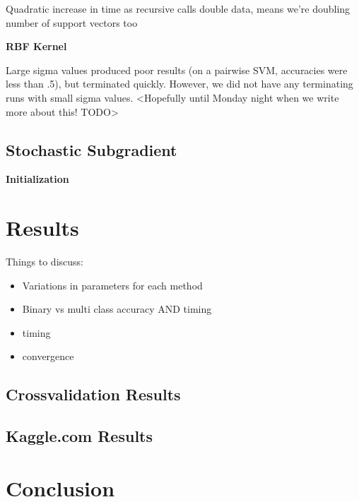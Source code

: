 \documentclass[letterpaper, 11pt]{article}
\begin{document}
Quadratic increase in time as recursive calls double data, means we're doubling number of support vectors too

\textbf{RBF Kernel}

Large sigma values produced poor results (on a pairwise SVM, accuracies were less than .5), but terminated quickly.  However, we did not have any terminating runs with small sigma values. <Hopefully until Monday night when we write more about this! TODO>


\subsection{Stochastic Subgradient}

\textbf{Initialization}


\section{Results}
Things to discuss:
\begin{itemize}
	\item Variations in parameters for each method
	\item Binary vs multi class accuracy AND timing
	\item timing
	\item convergence
\end{itemize}

\subsection{Crossvalidation Results}


\subsection{Kaggle.com Results}

\section{Conclusion}



\nocite{*}
 

\end{document}
